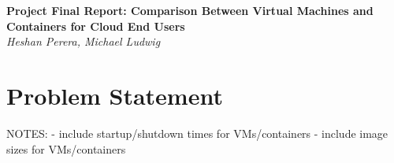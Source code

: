 \documentclass[11pt]{article}
\begin{document}
\renewcommand{\headrulewidth}{0pt} 
\renewcommand{\footrulewidth}{0pt} 
\pagestyle{fancy}
\cfoot{}
\lhead{}
\rhead{}
\lfoot{\itshape\textcolor{gray}{CS525T Cloud Computing Final Report}}

\begin{center}
{\LARGE \bf Project Final Report: Comparison Between Virtual Machines and Containers for Cloud End Users} \\
{\normalsize \emph{Heshan Perera, Michael Ludwig}}\\
\end{center}



\section{Problem Statement}

NOTES:
- include startup/shutdown times for VMs/containers
- include image sizes for VMs/containers
\end{document}
